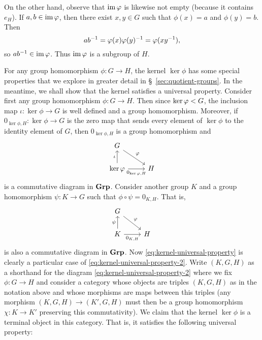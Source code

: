 On the other hand, observe that \(\operatorname{im} \varphi\) is likewise not empty (because it
contains \(e_H\)). If \(a, b \in \operatorname{im} \varphi\), then there exist \(x, y \in G\)
such that \(\phi(x) = a\) and \(\phi(y) = b\). Then
\[
    ab^{-1} = \varphi(x)\varphi(y)^{-1} = \varphi(xy^{-1}),
\]
so \(ab^{-1} \in \operatorname{im} \varphi\). Thus \(\operatorname{im} \varphi\) is a subgroup of \(H\).

For any group homomorphism \(\phi: G \to H\), the kernel \(\ker \phi\) has some
special properties that we explore in greater detail in
\S~\ref{sec:quotient-groups}. In the meantime, we shall show that the kernel
satisfies a universal property. Consider first any group homomorphism \(\phi: G
\to H\). Then since \(\ker \varphi < G\), the inclusion map \(\iota: \ker
\phi \to G\) is well defined and a group homomorphism. Moreover, if
\(0_{\ker\phi, H}: \ker \phi \to G\) is the zero map that sends every element of
\(\ker \phi\) to the identity element of \(G\), then \(0_{\ker\phi, H}\) is a
group homomorphism and
\begin{equation}
    \label{eq:kernel-universal-property}
    \begin{tikzcd}
        G \arrow[rd, "\phi"]                        &   \\
        \ker\phi \arrow[u, "\iota"] \arrow[r, "0_{\ker\phi, H}"'] & H
    \end{tikzcd}
\end{equation}
is a commutative diagram in \(\mathbf{Grp}\). Consider another group \(K\) and a group
homomorphism \(\psi: K \to G\) such that \(\phi \circ \psi = 0_{K,H}\). That is,
\begin{equation}
    \label{eq:kernel-universal-property-2}
    \begin{tikzcd}
        G \arrow[rd, "\phi"]                        &   \\
        K \arrow[u, "\psi"] \arrow[r, "0_{K,H}"'] & H
    \end{tikzcd}
\end{equation}
is also a commutative diagram in \(\mathbf{Grp}\). Now
\eqref{eq:kernel-universal-property} is clearly a particular case of
\eqref{eq:kernel-universal-property-2}. Write \((K, G, H)\) as a shorthand for
the diagram \eqref{eq:kernel-universal-property-2} where we fix \(\phi: G \to
H\) and consider a category whose objects are triples \((K, G, H)\) as in the
notation above and whose morphisms are maps between this triples (any morphism
\((K, G, H) \to (K', G, H)\) must then be a group homomorphism \(\chi: K \to
K'\) preserving this commutativity). We claim that the kernel \(\ker \phi\) is a
terminal object in this category. That is, it satisfies the following universal
property:

